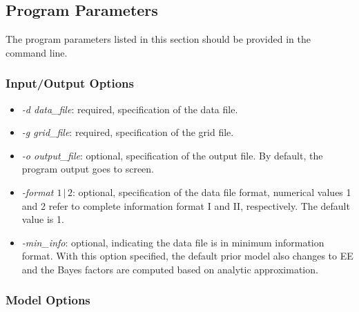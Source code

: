 \documentclass[11pt,fleqn]{article}
\begin{document}

\subsection{Program Parameters}

The program parameters listed in this section should be provided in the command line.

\subsubsection{Input/Output Options}

\begin{itemize}
  \item {\it -d data\_file}: required, specification of the data file.
  \item {\it -g grid\_file}: required, specification of the grid file.
  \item {\it -o output\_file}: optional, specification of the output file. By default, the program output goes to screen.
  \item {\it -format $1\,|\,2$}: optional, specification of the data file format, numerical values 1 and 2 refer to complete information format I and II, respectively. The default value is 1.
  \item {\it -min\_info}: optional, indicating the data file is in minimum information format. With this option specified, the default prior model also changes to EE and the Bayes factors are computed based on analytic approximation.
 \end{itemize}
 
\subsubsection{Model Options}
\end{document}
